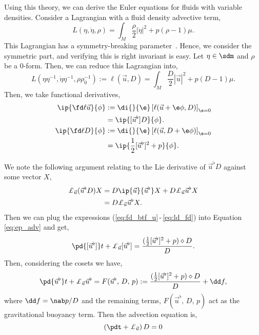\noindent
Using this theory, we can derive the Euler equations for fluids with variable densities. Consider a Lagrangian with a fluid density advective term,
$$ L(\eta, \dot\eta, \rho) = \int_M \frac{\rho}{2}|\dot \eta|^2 + p(\rho - 1)\mu. $$
This Lagrangian has a symmetry-breaking parameter~\cite{arthur}. Hence, we consider the symmetric part, and verifying this is right invariant is easy. Let $\eta \in \sdm$ and $\rho$ be a $0$-form. Then, we can reduce this Lagrangian into,
$$ L(\eta\eta^{-1}, \dot\eta\eta^{-1}, \rho\rho_0^{-1}) := \ell(\vec u, D) = \int_M \frac{D}{2}|\vec u|^2 + p(D-1) \mu. $$
Then, we take functional derivatives,
\begin{align}
  \ip{\fd \ell {\vec u}}{\phi} &:= \di{}{\e} \left[ \ell({\vec u} + \e \phi, D) \right]_{\e = 0}\notag \\
  &= \ip{[{\vec u}^\flat]D}{\phi}. \label{eq:fd_btf_u}\\
  \ip{\fd \ell D}{\phi} &:= \di{}{\e} \left[ \ell({\vec u}, D + \e \phi) \right]_{\e = 0}\notag \\
  &= \ip{\frac{1}{2}[{\vec u}^\flat]^2 + p}{\phi}.\label{eq:fd_btf_D}
\end{align}

\noindent
We note the following argument relating to the Lie derivative of $\vec u^\flat D$ against some vector $X$,
\begin{align}
  \pounds_{\vec u} (\vec u^\flat D) X &= D\ip{\vec u}{\vec u^\flat} X + D\pounds_{\vec u} \vec u^\flat X\notag \\
  &= D\pounds_{\vec u} \vec u^\flat X.\label{eq:ld_fd}
\end{align}
Then we can plug the expressions (\ref{eq:fd_btf_u}\,-\,\ref{eq:ld_fd}) into Equation \eqref{eq:ep_adv} and get,
$$ \pd {[{\vec u}^\flat]} t + \pounds_{\vec u} [{\vec u}^\flat] = \frac{(\frac{1}{2}[{\vec u}^\flat]^2 + p) \diamond D}{D}. $$
Then, considering the cosets we have,
$$ \pd {{\vec u}^\flat} t + \pounds_{\vec u} {\vec u}^\flat = F({\vec u}^\flat,\, D,\, p) := \frac{(\frac{1}{2}[{\vec u}^\flat]^2 + p) \diamond D}{D} + \dd f, $$
where $\dd f = \nab p / D$ and the remaining terms, $F(\vec u^\flat,\, D,\, p)$ act as the gravitational buoyancy term. Then the advection equation is,
$$ \left( \pdt + \pounds_{\vec u} \right)D = 0 $$


